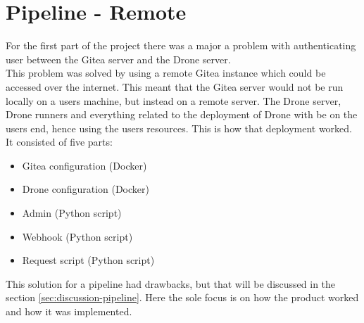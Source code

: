 \section{Pipeline - Remote}
\label{sec:pipeline_remote}
For the first part of the project there was a major a problem with authenticating user between the Gitea server and 
the Drone server.\\
This problem was solved by using a remote Gitea instance which could be accessed over the internet. This meant that the 
Gitea server would not be run locally on a users machine, but instead on a remote server. The Drone server, Drone runners and everything 
related to the deployment of Drone with be on the users end, hence using the users resources. This is how that deployment worked. It consisted of 
five parts:

\begin{itemize}
    \item Gitea configuration (Docker)
    \item Drone configuration (Docker)
    \item Admin (Python script)
    \item Webhook (Python script)
    \item Request script (Python script)
\end{itemize}
This solution for a pipeline had drawbacks, but that will be discussed in the section \ref{sec:discussion-pipeline}. Here
the sole focus is on how the 
product worked and how it was implemented.

